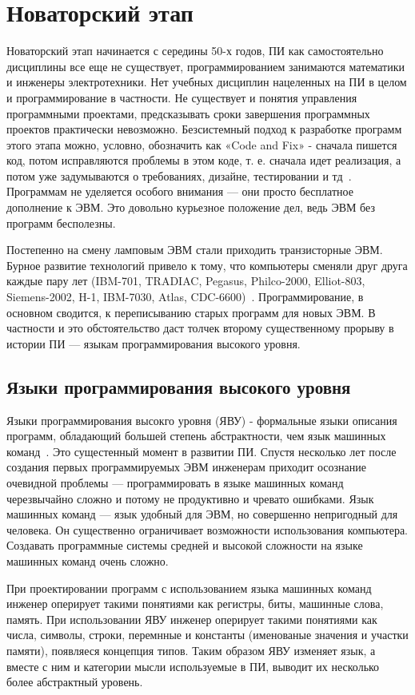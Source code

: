 \section{Новаторский этап}

Новаторский этап начинается с середины 50-х годов, ПИ как самостоятельно дисциплины все еще не существует, программированием занимаются математики и инженеры электротехники. Нет учебных дисциплин нацеленных на ПИ в целом и программирование в частности. Не существует и понятия управления программными проектами, предсказывать сроки завершения программных проектов практически невозможно. Безсистемный подход к разработке программ этого этапа можно, условно, обозначить как «Code and Fix» - сначала пишется код, потом исправляются проблемы в этом коде, т. е. сначала идет реализация, а потом уже задумываются о требованиях, дизайне, тестировании и тд~\cite{Boehm:1988:SMSD}. Программам не уделяется особого внимания — они просто бесплатное дополнение к ЭВМ. Это довольно курьезное положение дел, ведь ЭВМ без программ бесполезны.

Постепенно на смену ламповым ЭВМ стали приходить транзисторные ЭВМ. Бурное развитие технологий привело к тому, что компьютеры сменяли друг друга каждые пару лет (IBM-701, TRADIAC, Pegasus, Philco-2000, Elliot-803, Siemens-2002, H-1, IBM-7030, Atlas, CDC-6600)~\cite{Glass}. Программирование, в основном сводится, к переписыванию старых программ для новых ЭВМ. В частности и это обстоятельство даст толчек второму существенному прорыву в истории ПИ — языкам программирования высокого уровня.

\subsection{Языки программирования высокого уровня}

Языки программирования высокго уровня (ЯВУ) - формальные языки описания программ, обладающий большей степень абстрактности, чем язык машинных команд~\cite{HLPL}. Это сущестенный момент в развитии ПИ. Спустя несколько лет после создания первых программируемых ЭВМ инженерам приходит осознание очевидной проблемы — программировать в языке машинных команд черезвычайно сложно и потому не продуктивно и чревато ошибками. Язык машинных команд — язык удобный для ЭВМ, но совершенно непригодный для человека. Он существенно ограничивает возможности использования компьютера. Создавать программные системы средней и высокой сложности на языке машинных команд очень сложно.

При проектировании программ с использованием языка машинных команд инженер оперирует такими понятиями как регистры, биты, машинные слова, память. При использовании ЯВУ инженер оперирует такими понятиями как числа, символы, строки, перемнные и константы (именованые значения и участки памяти), появляеся концепция типов. Таким образом ЯВУ изменяет язык, а вместе с ним и категории мысли используемые в ПИ, выводит их несколько более абстрактный уровень.

